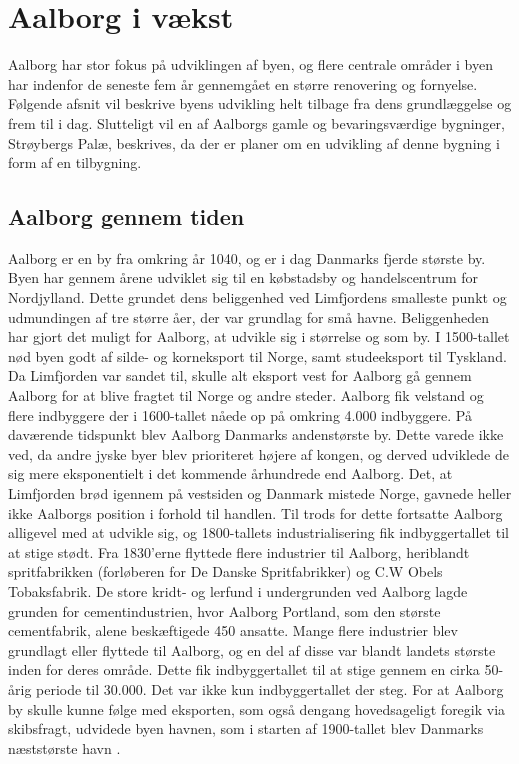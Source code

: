 \chapter{Aalborg i vækst}
Aalborg har stor fokus på udviklingen af byen, og flere centrale områder i byen har indenfor de seneste fem år gennemgået en større renovering og fornyelse. Følgende afsnit vil beskrive byens udvikling helt tilbage fra dens grundlæggelse og frem til i dag. Slutteligt vil en af Aalborgs gamle og bevaringsværdige bygninger, Strøybergs Palæ, beskrives, da der er planer om en udvikling af denne bygning i form af en tilbygning. 

\section{Aalborg gennem tiden}
Aalborg er en by fra omkring år 1040, og er i dag Danmarks fjerde største by. Byen har gennem årene udviklet sig til en købstadsby og handelscentrum for Nordjylland. Dette grundet dens beliggenhed ved Limfjordens smalleste punkt og udmundingen af tre større åer, der var grundlag for små havne. Beliggenheden har gjort det muligt for Aalborg, at udvikle sig i størrelse og som by. I 1500-tallet nød byen godt af silde- og korneksport til Norge, samt studeeksport til Tyskland. Da Limfjorden var sandet til, skulle alt eksport vest for Aalborg gå gennem Aalborg for at blive fragtet til Norge og andre steder. Aalborg fik velstand og flere indbyggere der i 1600-tallet nåede op på omkring 4.000 indbyggere. På daværende tidspunkt blev Aalborg Danmarks andenstørste by. Dette varede ikke ved, da andre jyske byer blev prioriteret højere af kongen, og derved udviklede de sig mere eksponentielt i det kommende århundrede end Aalborg. Det, at Limfjorden brød igennem på vestsiden og Danmark mistede Norge, gavnede heller ikke Aalborgs position i forhold til handlen.
\newline \indent{     }  Til trods for dette fortsatte Aalborg alligevel med at udvikle sig, og 1800-tallets industrialisering fik indbyggertallet til at stige stødt. Fra 1830’erne flyttede flere industrier til Aalborg, heriblandt spritfabrikken (forløberen for De Danske Spritfabrikker) og C.W Obels Tobaksfabrik. De store kridt- og lerfund i undergrunden ved Aalborg lagde grunden for cementindustrien, hvor Aalborg Portland, som den største cementfabrik, alene beskæftigede 450 ansatte. Mange flere industrier blev grundlagt eller flyttede til Aalborg, og en del af disse var blandt landets største inden for deres område. Dette fik indbyggertallet til at stige gennem en cirka 50-årig periode til 30.000. Det var ikke kun indbyggertallet der steg. For at Aalborg by skulle kunne følge med eksporten, som også dengang hovedsageligt foregik via skibsfragt, udvidede byen havnen, som i starten af 1900-tallet blev Danmarks næststørste havn \citep{byhistorie}.
